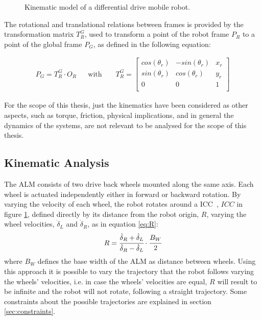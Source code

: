 \begin{figure}[!ht]
  \caption{Kinematic model of a differential drive mobile robot.}
  \label{fig:TikzKine}
\end{figure}

The rotational and translational relations between frames is provided by the transformation matrix $T^G_R$, used to transform a point of the robot frame $P_R$ to a point of the global frame $P_G$, as defined in the following equation:

\begin{align}
P_{G} = T^G_R \cdot O_{R} && \text{with } && T^G_R =
\begin{bmatrix}
cos(\theta_r) & -sin(\theta_r) & x_r \\
sin(\theta_r) & cos(\theta_r) & y_r \\
0 & 0 & 1 \\
\end{bmatrix}
\label{eq:transfPoint}
\end{align}

For the scope of this thesis, just the kinematics have been considered as other aspects, such as torque, friction, physical implications, and in general the dynamics of the systems, are not relevant to be analysed for the scope of this thesis.

\subsection{Kinematic Analysis}
\label{ssec:kin_a}
\noindent
The \gls{ALM} consists of two drive back wheels mounted along the same axis.
Each wheel is actuated independently either in forward or backward rotation.
By varying the velocity of each wheel, the robot rotates around a \gls{ICC}~\cite{ICC}, $ICC$ in figure \ref{fig:TikzKine}, defined directly by its distance from the robot origin, $R$, varying the wheel velocities, $\dot \delta_L$ and $\dot \delta_R$, as in equation \eqref{eq:R}:
\begin{equation}
    R = \cfrac{\dot \delta_R + \dot \delta_L}{\dot \delta_R - \dot \delta_L} \cdot \cfrac{B_W}{2}
    \label{eq:R}
\end{equation}
where $B_W$ defines the base width of the \gls{ALM} as distance between wheels.
Using this approach it is possible to vary the trajectory that the robot follows varying the wheels' velocities, i.e. in case the wheels' velocities are equal, $R$ will result to be infinite and the robot will not rotate, following a straight trajectory.
Some constraints about the possible trajectories are explained in section \ref{sec:constraints}.

